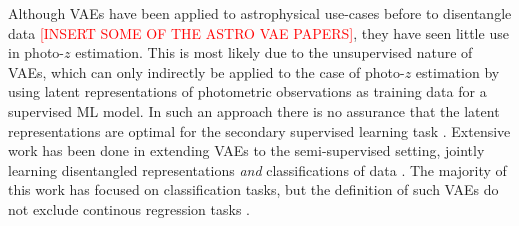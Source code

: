Although VAEs have been applied to astrophysical use-cases before to disentangle data \textcolor{red}{[INSERT SOME OF THE ASTRO VAE PAPERS]}, they have seen little use in photo-$z$ estimation. This is most likely due to the unsupervised nature of VAEs, which can only indirectly be applied to the case of photo-$z$ estimation by using latent representations of photometric observations as training data for a supervised ML model. In such an approach there is no assurance that the latent representations are optimal for the secondary supervised learning task \cite{kingmaSemiSupervisedLearningDeep2014}. Extensive work has been done in extending VAEs to the semi-supervised setting, jointly learning disentangled representations \textit{and} classifications of data \citep{kingmaSemiSupervisedLearningDeep2014, maaloeAuxiliaryDeepGenerative2016, maaloeBIVAVeryDeep2019}. The majority of this work has focused on classification tasks, but the definition of such VAEs do not exclude continous regression tasks \citep{maaloeAuxiliaryDeepGenerative2016}.
